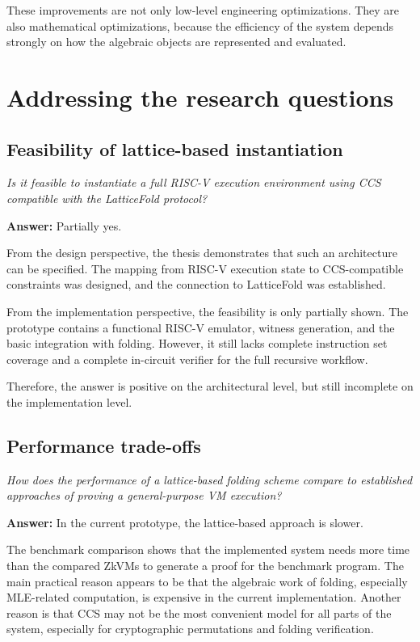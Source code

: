 These improvements are not only low-level engineering optimizations. They are
also mathematical optimizations, because the efficiency of the system depends
strongly on how the algebraic objects are represented and evaluated.

\section{Addressing the research questions}

\subsection*{Feasibility of lattice-based instantiation}

\textit{Is it feasible to instantiate a full RISC-V execution environment using
	CCS compatible with the LatticeFold protocol?}

\textbf{Answer:} Partially yes.

From the design perspective, the thesis demonstrates that such an architecture
can be specified. The mapping from RISC-V execution state to CCS-compatible
constraints was designed, and the connection to LatticeFold was established.

From the implementation perspective, the feasibility is only partially shown.
The prototype contains a functional RISC-V emulator, witness generation, and the
basic integration with folding. However, it still lacks complete instruction set
coverage and a complete in-circuit verifier for the full recursive workflow.

Therefore, the answer is positive on the architectural level, but still
incomplete on the implementation level.

\subsection*{Performance trade-offs}

\textit{How does the performance of a lattice-based folding scheme compare to established approaches of proving a general-purpose VM execution?}

\textbf{Answer:} In the current prototype, the lattice-based approach is slower.

The benchmark comparison shows that the implemented system needs more time than
the compared ZkVMs to generate a proof for the benchmark program. The main
practical reason appears to be that the algebraic work of folding, especially
MLE-related computation, is expensive in the current implementation. Another
reason is that CCS may not be the most convenient model for all parts of the
system, especially for cryptographic permutations and folding verification.

